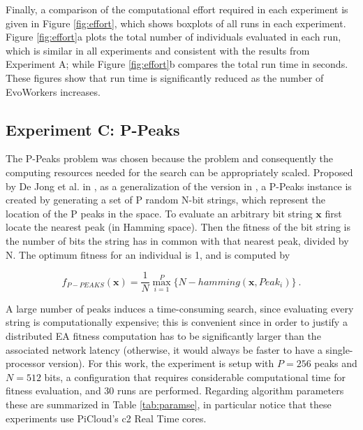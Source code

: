 Finally, a comparison of the computational effort required in each experiment is given in
Figure \ref{fig:effort}, which shows boxplots of all runs in each experiment.
Figure \ref{fig:effort}a plots the total number of individuals evaluated in each run, which is similar in all experiments
and consistent with the results from Experiment A;
while Figure \ref{fig:effort}b compares the total run time in seconds.
These figures show that run time is significantly reduced as the number of EvoWorkers increases.



\subsection{Experiment C: P-Peaks}
\label{expb}

The P-Peaks problem was chosen because the problem and consequently the computing resources needed for the search can be appropriately scaled.
Proposed by De Jong et al. in \cite{Jong:PS97}, as a generalization of the version in \cite{Jong:1990}, a
P-Peaks instance is created by generating a set of P random N-bit
strings, which represent the location of the P peaks in the space. To
evaluate an arbitrary bit string \begin{math} \mathbf{x} \end{math}
first locate the nearest peak (in Hamming space). Then the fitness of
the bit string is the number of bits the string has in common with
that nearest peak, divided by N. The optimum fitness for an individual
is 1, and is computed by

\begin{equation}
f_{P-PEAKS}(\mathbf{x})=\frac{1}{N} \overset{P}{\max_{i=1}} \{N-hamming(\mathbf{x},Peak_i)   \} \ .
\end{equation}

A large number of peaks induces a time-consuming search,
since evaluating every string is computationally expensive; this is
convenient since in order to justify a distributed EA fitness computation has to be significantly larger than the associated
network latency (otherwise, it would always be faster to have a single-processor version).
For this work, the experiment is setup with $P = 256$ peaks and $N = 512$ bits, a configuration that requires considerable computational time for
fitness evaluation, and 30 runs are performed.
Regarding algorithm parameters these are summarized in Table \ref{tab:paramse},
in particular notice that these experiments use PiCloud's c2 Real Time cores.


